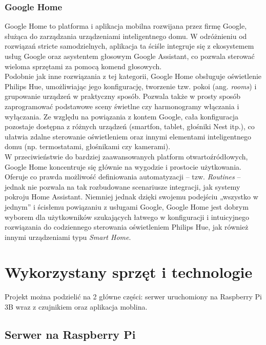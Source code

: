 \documentclass[12pt]{article}
\begin{document}
\subsubsection{Google Home}
Google Home to platforma i aplikacja mobilna rozwijana przez firmę Google, służąca do zarządzania urządzeniami inteligentnego domu.
W odróżnieniu od rozwiązań stricte samodzielnych, aplikacja ta ściśle integruje się z ekosystemem usług Google oraz asystentem głosowym Google Assistant,
co pozwala sterować wieloma sprzętami za pomocą komend głosowych.\\
Podobnie jak inne rozwiązania z tej kategorii, Google Home obsługuje oświetlenie Philips Hue, umożliwiając jego konfigurację, tworzenie tzw. pokoi (ang. \textit{rooms})
i grupowanie urządzeń w praktyczny sposób. Pozwala także w prosty sposób zaprogramować podstawowe sceny świetlne czy harmonogramy włączania i wyłączania.
Ze względu na powiązania z kontem Google, cała konfiguracja pozostaje dostępna z różnych urządzeń (smartfon, tablet, głośniki Nest itp.),
co ułatwia zdalne sterowanie oświetleniem oraz innymi elementami inteligentnego domu (np. termostatami, głośnikami czy kamerami).\\
W przeciwieństwie do bardziej zaawansowanych platform otwartoźródłowych, Google Home koncentruje się głównie na wygodzie i prostocie użytkowania.
Oferuje co prawda możliwość definiowania automatyzacji – tzw. \textit{Routines} – jednak nie pozwala na tak rozbudowane scenariusze integracji,
jak systemy pokroju Home Assistant. Niemniej jednak dzięki swojemu podejściu „wszystko w jednym” i ścisłemu powiązaniu z usługami Google,
Google Home jest dobrym wyborem dla użytkowników szukających łatwego w konfiguracji i intuicyjnego rozwiązania do codziennego sterowania oświetleniem Philips Hue,
jak również innymi urządzeniami typu \textit{Smart Home}. \cite{dokumentacja-google-home}

\clearpage

\section{Wykorzystany sprzęt i technologie}
Projekt można podzielić na 2 główne części: serwer uruchomiony na Raspberry Pi 3B wraz z czujnikiem oraz aplikacja moblina.
\subsection{Serwer na Raspberry Pi}
\end{document}
